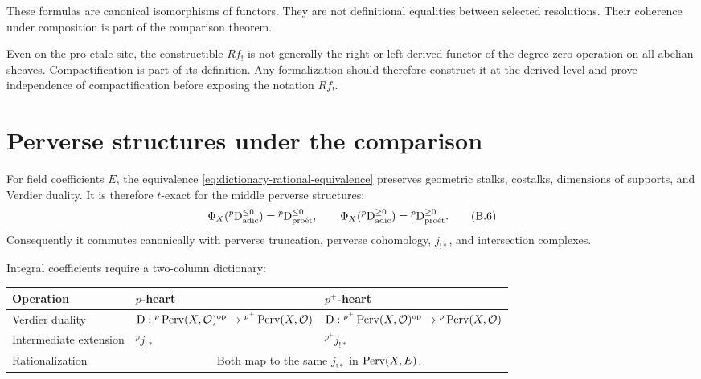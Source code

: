 These formulas are canonical isomorphisms of functors.  They are not
definitional equalities between selected resolutions.  Their coherence under
composition is part of the comparison theorem.

\begin{warning}
\label{warn:dictionary-fshriek}
Even on the pro-etale site, the constructible \(Rf_!\) is not generally the
right or left derived functor of the degree-zero operation on all abelian
sheaves.  Compactification is part of its definition.  Any formalization
should therefore construct it at the derived level and prove independence of
compactification before exposing the notation \(Rf_!\).
\end{warning}

\section{Perverse structures under the comparison}

For field coefficients \(E\), the equivalence
\eqref{eq:dictionary-rational-equivalence} preserves geometric stalks,
costalks, dimensions of supports, and Verdier duality.  It is therefore
\(t\)-exact for the middle perverse structures:
\[
 \Phi_X({}^p\mathrm D^{\leq0}_{\mathrm{adic}})
   ={}^p\mathrm D^{\leq0}_{\mathrm{pro\acute et}},
\qquad
 \Phi_X({}^p\mathrm D^{\geq0}_{\mathrm{adic}})
   ={}^p\mathrm D^{\geq0}_{\mathrm{pro\acute et}}.
\tag{B.6}\label{eq:dictionary-perverse-texact}
\]
Consequently it commutes canonically with perverse truncation, perverse
cohomology, \(j_{!*}\), and intersection complexes.

Integral coefficients require a two-column dictionary:

\begin{center}
\begin{tabularx}{0.94\textwidth}{>{\raggedright\arraybackslash}p{}XX}
\toprule
Operation & \(p\)-heart & \(p^+\)-heart\\
\midrule
Verdier duality &
\(\mathrm D:{}^p\operatorname{Perv}(X,\mathcal O)^{\mathrm{op}}\to{}^{p^+}\operatorname{Perv}(X,\mathcal O)\) &
\(\mathrm D:{}^{p^+}\operatorname{Perv}(X,\mathcal O)^{\mathrm{op}}\to{}^p\operatorname{Perv}(X,\mathcal O)\)\\
Intermediate extension &
\({}^pj_{!*}\) &
\({}^{p^+}j_{!*}\)\\
Rationalization &
\multicolumn{2}{c}{Both map to the same
\(j_{!*}\) in \(\operatorname{Perv}(X,E)\).}\\
\bottomrule
\end{tabularx}
\end{center}

